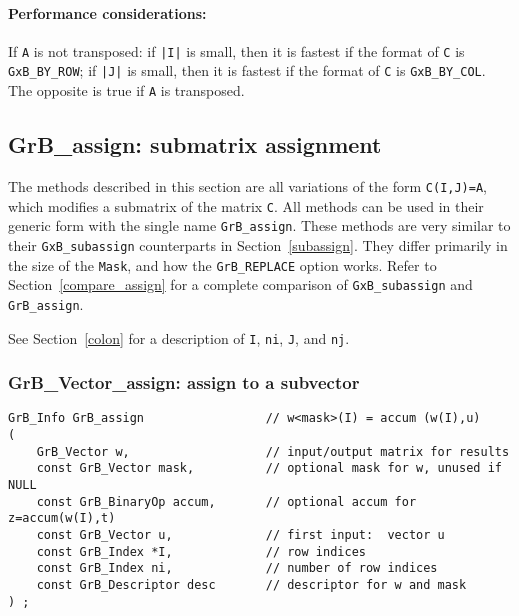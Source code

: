\documentclass[12pt]{article}
\begin{document}
\paragraph{\bf Performance considerations:} %
If \verb'A' is not transposed: if \verb'|I|' is small, then it is fastest if
the format of \verb'C' is \verb'GxB_BY_ROW'; if \verb'|J|' is small, then it is
fastest if the format of \verb'C' is \verb'GxB_BY_COL'.  The opposite is true
if \verb'A' is transposed.

\newpage
\subsection{{\sf GrB\_assign:} submatrix assignment} %
\label{assign}

The methods described in this section are all variations of the form
\verb'C(I,J)=A', which modifies a submatrix of the matrix \verb'C'.  All
methods can be used in their generic form with the single name
\verb'GrB_assign'.  These methods are very similar to their
\verb'GxB_subassign' counterparts in Section~\ref{subassign}.  They differ
primarily in the size of the \verb'Mask', and how the \verb'GrB_REPLACE' option
works.  Refer to Section~\ref{compare_assign} for a complete comparison of
\verb'GxB_subassign' and \verb'GrB_assign'.

See Section~\ref{colon} for a description of
\verb'I', \verb'ni', \verb'J', and \verb'nj'.

\subsubsection{{\sf GrB\_Vector\_assign:} assign to a subvector }
\label{assign_vector}

\begin{mdframed}[userdefinedwidth=6in]
{\footnotesize
\begin{verbatim}
GrB_Info GrB_assign                 // w<mask>(I) = accum (w(I),u)
(
    GrB_Vector w,                   // input/output matrix for results
    const GrB_Vector mask,          // optional mask for w, unused if NULL
    const GrB_BinaryOp accum,       // optional accum for z=accum(w(I),t)
    const GrB_Vector u,             // first input:  vector u
    const GrB_Index *I,             // row indices
    const GrB_Index ni,             // number of row indices
    const GrB_Descriptor desc       // descriptor for w and mask
) ;
\end{verbatim} } \end{mdframed}
\end{document}
